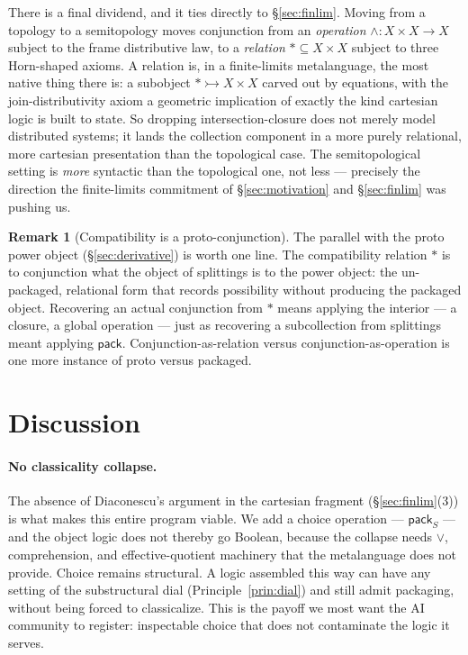 \documentclass[11pt]{article}
\theoremstyle{definition}
\newtheorem{remark}[definition]{Remark}
\theoremstyle{plain}
\newcommand{\Coll}{S}
\newcommand{\pack}{\mathsf{pack}}
\begin{document}
There is a final dividend, and it ties directly to \S\ref{sec:finlim}. Moving
from a topology to a semitopology moves conjunction from an \emph{operation}
$\wedge : X\times X\to X$ subject to the frame distributive law, to a
\emph{relation} $*\subseteq X\times X$ subject to three Horn-shaped axioms. A
relation is, in a finite-limits metalanguage, the most native thing there is: a
subobject ${*}\rightarrowtail X\times X$ carved out by equations, with the
join-distributivity axiom a geometric implication of exactly the kind cartesian
logic is built to state. So dropping intersection-closure does not merely model
distributed systems; it lands the collection component in a more purely
relational, more cartesian presentation than the topological case. The
semitopological setting is \emph{more} syntactic than the topological one, not
less --- precisely the direction the finite-limits commitment of
\S\ref{sec:motivation} and \S\ref{sec:finlim} was pushing us.

\begin{remark}[Compatibility is a proto-conjunction]
The parallel with the proto power object (\S\ref{sec:derivative}) is worth one
line. The compatibility relation $*$ is to conjunction what the object of
splittings is to the power object: the un-packaged, relational form that
records possibility without producing the packaged object. Recovering an actual
conjunction from $*$ means applying the interior --- a closure, a global
operation --- just as recovering a subcollection from splittings meant applying
$\pack$. Conjunction-as-relation versus conjunction-as-operation is one more
instance of proto versus packaged.
\end{remark}

\section{Discussion}
\label{sec:discussion}

\paragraph{No classicality collapse.} The absence of Diaconescu's argument in
the cartesian fragment (\S\ref{sec:finlim}(3)) is what makes this entire
program viable. We add a choice operation --- $\pack_{\Coll}$ --- and the
object logic does not thereby go Boolean, because the collapse needs $\vee$,
comprehension, and effective-quotient machinery that the metalanguage does not
provide. Choice remains structural. A logic assembled this way can have any
setting of the substructural dial (Principle~\ref{prin:dial}) and still admit
packaging, without being forced to classicalize. This is the payoff we most
want the AI community to register: inspectable choice that does not
contaminate the logic it serves.
\end{document}
